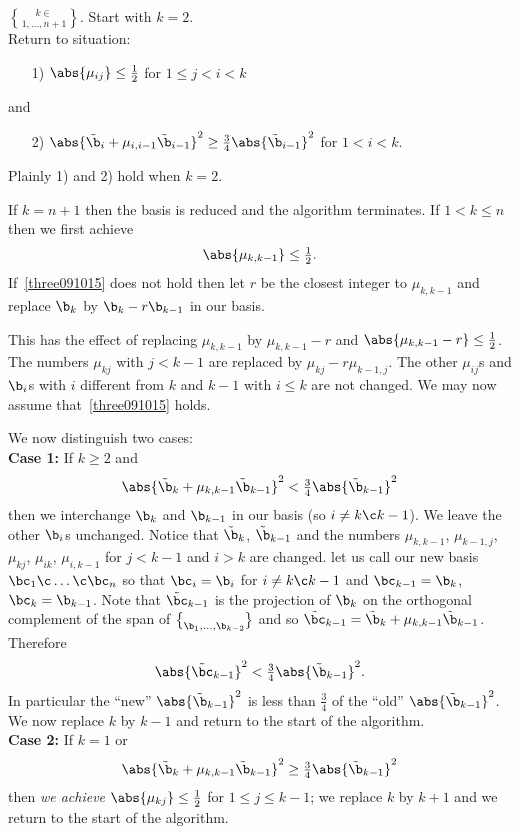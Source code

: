 $k\in\brace{1,\dotsc,n+1}$.  Start with $k=2$. \\
Return to situation:
\begin{enumerate}
\item[1)] $\abs{\mu_{ij}}\leq\frac12$ for $1\leq j<i<k$
\end{enumerate}
and
\begin{enumerate}
\item[2)] $\abs{\tilde\b_i+\mu_{i,i-1}\tilde\b_{i-1}}^2\geq\frac34\abs{\tilde\b_{i-1}}^2$ for $1<i<k$.
\end{enumerate}
Plainly 1) and 2) hold when $k=2$.

If $k=n+1$ then the basis is reduced and the algorithm terminates.  If $1<k\leq n$ then we first achieve
\begin{equation} \abs{\mu_{k,k-1}}\leq\tfrac12 . \label{three091015} \end{equation}
If~\eqref{three091015} does not hold then let $r$ be the closest integer to $\mu_{k,k-1}$ and replace $\b_k$ by $\b_k-r\b_{k-1}$ in our basis.

This has the effect of replacing $\mu_{k,k-1}$ by $\mu_{k,k-1}-r$ and $\abs{\mu_{k,k-1}-r}\leq\frac12$.  The numbers $\mu_{kj}$ with $j<k-1$ are replaced by $\mu_{kj}-r\mu_{k-1,j}$.  The other $\mu_{ij}$s and $\b_i$s with $i$ different from $k$ and $k-1$ with $i\leq k$ are not changed.  We may now assume that~\eqref{three091015} holds.

We now distinguish two cases: \\
\textbf{Case 1:} If $k\geq2$ and
\[ \abs{\tilde\b_k+\mu_{k,k-1}\tilde\b_{k-1}}^2 < \tfrac34\abs{\tilde\b_{k-1}}^2 \]
then we interchange $\b_k$ and $\b_{k-1}$ in our basis (so $i\neq k\c k-1$).  We leave the other $\b_i$s unchanged.  Notice that $\tilde\b_k$, $\tilde\b_{k-1}$ and the numbers $\mu_{k,k-1}$, $\mu_{k-1,j}$, $\mu_{kj}$, $\mu_{ik}$, $\mu_{i,k-1}$ for $j<k-1$ and $i>k$ are changed.  let us call our new basis $\bc_1\c \dotsc\c \bc_n$ so that $\bc_i=\b_i$ for $i\neq k\c k-1$ and $\bc_{k-1}=\b_k$, $\bc_k=\b_{k-1}$.  Note that $\tilde\bc_{k-1}$ is the projection of $\b_k$ on the orthogonal complement of the span of $\brace{\b_1,\dotsc,\b_{k-2}}$ and so $\tilde\bc_{k-1}=\tilde\b_k+\mu_{k,k-1}\tilde\b_{k-1}$.  Therefore
\[ \abs{\tilde\bc_{k-1}}^2 < \tfrac34\abs{\tilde\b_{k-1}}^2 . \]
In particular the ``new'' $\abs{\tilde\b_{k-1}}^2$ is less than $\frac34$ of the ``old'' $\abs{\tilde\b_{k-1}}^2$.  We now replace $k$ by $k-1$ and return to the start of the algorithm. \\
\textbf{Case 2:} If $k=1$ or
\[ \abs{\tilde\b_k+\mu_{k,k-1}\tilde\b_{k-1}}^2 \geq \tfrac34 \abs{\tilde\b_{k-1}}^2 \]
then \emph{we achieve} $\abs{\mu_{kj}}\leq\frac12$ for $1\leq j\leq k-1$; we replace $k$ by $k+1$ and we return to the start of the algorithm.

